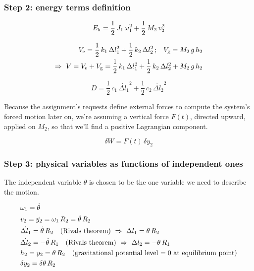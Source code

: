 \documentclass[a4paper,12pt,oneside]{article}
\begin{document}
\subsubsection*{Step 2: energy terms definition}

\[ E_\textup{k} = \frac{1}{2} \, J_1 \, \omega_1^2 + \frac{1}{2} \, M_2 \, v_2^2 \]

\[ \begin{split}
	V_\textup{e} = \frac{1}{2} \, k_1 \, \Delta l_1^2 +
		\frac{1}{2} \, k_2 \, \Delta l_2^2 \, \text{;} \quad
		V_\textup{g} = M_2 \, g \, h_2 \\
	\Rightarrow ~ V = V_\textup{e} + V_\textup{g} =
		\frac{1}{2} \, k_1 \, \Delta l_1^2 + \frac{1}{2} \, k_2 \, \Delta l_2^2
		+ M_2 \, g \, h_2
\end{split} \]

\[
	D = \frac{1}{2} \, c_1 \, \dot{\Delta l_1}^2 +
		\frac{1}{2} \, c_2 \, \dot{\Delta l_2}^2
\]

Because the assignment's requests define external forces to compute the system's forced motion later on, we're assuming a vertical force $ F(t) $, directed upward, applied on $ M_2 $, so that we'll find a positive Lagrangian component.

\[ \delta W = F(t) \, \delta y_2 \]

\subsubsection*{Step 3: physical variables as functions of independent ones}

The independent variable $ \theta $ is chosen to be the one variable we need to describe the motion.

\[ \begin{split}
	& \omega_1 = \dot{\theta} \\
	& v_2 = \dot{y_2} = \omega_1 \, R_2 = \dot{\theta} \, R_2 \\
	& \dot{\Delta l_1} = \dot{\theta} \, R_2 \quad \text{(Rivals theorem)}
		~ \Rightarrow ~ \Delta l_1 = \theta \, R_2 \\
	& \dot{\Delta l_2} = - \dot{\theta} \, R_1 \quad \text{(Rivals theorem)}
		~ \Rightarrow ~ \Delta l_2 = - \theta \, R_1 \\
	& h_2 = y_2 = \theta \, R_2
		\quad \text{(gravitational potential level $ = 0 $ at equilibrium point)} \\
	& \delta y_2 = \delta \theta \, R_2 \\
\end{split} \]
\end{document}
